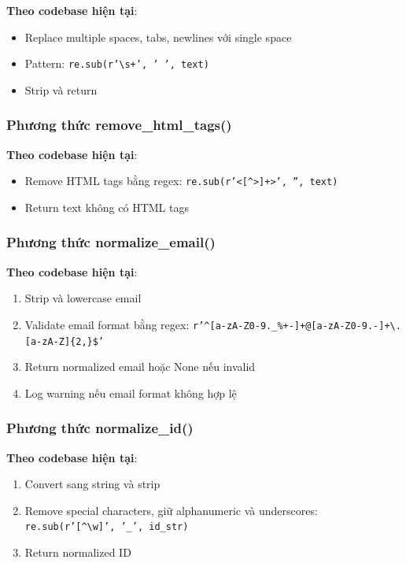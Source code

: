 \textbf{Theo codebase hiện tại}:
\begin{itemize}
    \item Replace multiple spaces, tabs, newlines với single space
    \item Pattern: \texttt{re.sub(r'\textbackslash s+', ' ', text)}
    \item Strip và return
\end{itemize}

\subsubsection{Phương thức remove\_html\_tags()}

\textbf{Theo codebase hiện tại}:
\begin{itemize}
    \item Remove HTML tags bằng regex: \texttt{re.sub(r'<[\textasciicircum >]+>', '', text)}
    \item Return text không có HTML tags
\end{itemize}

\subsubsection{Phương thức normalize\_email()}

\textbf{Theo codebase hiện tại}:
\begin{enumerate}
    \item Strip và lowercase email
    \item Validate email format bằng regex: \texttt{r'\textasciicircum [a-zA-Z0-9.\_\%+-]+@[a-zA-Z0-9.-]+\textbackslash .[a-zA-Z]\{2,\}\$'}
    \item Return normalized email hoặc None nếu invalid
    \item Log warning nếu email format không hợp lệ
\end{enumerate}

\subsubsection{Phương thức normalize\_id()}

\textbf{Theo codebase hiện tại}:
\begin{enumerate}
    \item Convert sang string và strip
    \item Remove special characters, giữ alphanumeric và underscores: \texttt{re.sub(r'[\textasciicircum \textbackslash w]', '\_', id\_str)}
    \item Return normalized ID
\end{enumerate}

